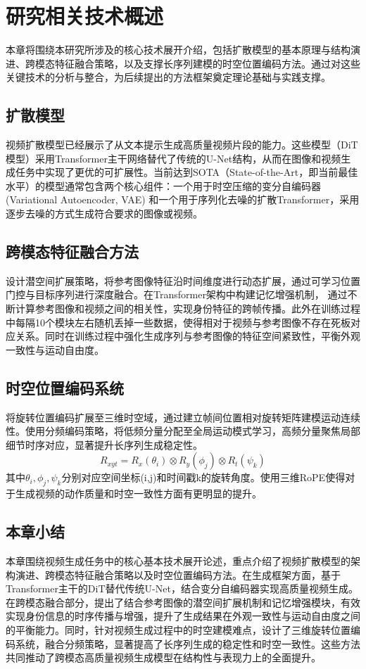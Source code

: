 \cleardoublepage

\section{研究相关技术概述}
本章将围绕本研究所涉及的核心技术展开介绍，包括扩散模型的基本原理与结构演进、跨模态特征融合策略，以及支撑长序列建模的时空位置编码方法。通过对这些关键技术的分析与整合，为后续提出的方法框架奠定理论基础与实践支撑。
\subsection{扩散模型}
视频扩散模型已经展示了从文本提示生成高质量视频片段的能力。这些模型（DiT模型）采用Transformer主干网络替代了传统的U-Net结构，从而在图像和视频生成任务中实现了更优的可扩展性。当前达到SOTA（State-of-the-Art，即当前最佳水平）的模型通常包含两个核心组件：一个用于时空压缩的变分自编码器 (Variational Autoencoder, VAE) 和一个用于序列化去噪的扩散Transformer，采用逐步去噪的方式生成符合要求的图像或视频。

\subsection{跨模态特征融合方法}
设计潜空间扩展策略，将参考图像特征沿时间维度进行动态扩展，通过可学习位置门控与目标序列进行深度融合。在Transformer架构中构建记忆增强机制， 通过不断计算参考图像和视频之间的相关性，实现身份特征的跨帧传播。此外在训练过程中每隔10个模块左右随机丢掉一些数据，使得相对于视频与参考图像不存在死板对应关系。同时在训练过程中强化生成序列与参考图像的特征空间紧致性，平衡外观一致性与运动自由度。

\subsection{时空位置编码系统}
将旋转位置编码扩展至三维时空域，通过建立帧间位置相对旋转矩阵建模运动连续性。使用分频编码策略，将低频分量分配至全局运动模式学习，高频分量聚焦局部细节时序对应，显著提升长序列生成稳定性。
\begin{equation}
R_{xyt} = R_x(\theta_i) \otimes R_y(\phi_j) \otimes R_t(\psi_k)
\end{equation}
其中$\theta_i,\phi_j,\psi_k$分别对应空间坐标(i,j)和时间戳k的旋转角度。使用三维RoPE使得对于生成视频的动作质量和时空一致性方面有更明显的提升。

\subsection{本章小结}
本章围绕视频生成任务中的核心基本技术展开论述，重点介绍了视频扩散模型的架构演进、跨模态特征融合策略以及时空位置编码方法。在生成框架方面，基于Transformer主干的DiT替代传统U-Net，结合变分自编码器实现高质量视频生成。在跨模态融合部分，提出了结合参考图像的潜空间扩展机制和记忆增强模块，有效实现身份信息的时序传播与增强，提升了生成结果在外观一致性与运动自由度之间的平衡能力。同时，针对视频生成过程中的时空建模难点，设计了三维旋转位置编码系统，融合分频策略，显著提高了长序列生成的稳定性和时空一致性。这些方法共同推动了跨模态高质量视频生成模型在结构性与表现力上的全面提升。

